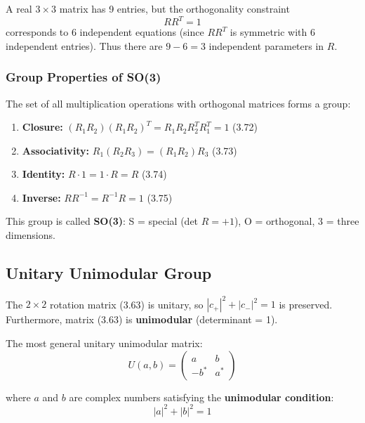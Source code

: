 \documentclass[11pt,a4paper]{article}
\begin{document}
A real $3 \times 3$ matrix has 9 entries, but the orthogonality constraint
\begin{equation}
RR^T = 1
\tag{3.71}
\end{equation}
corresponds to 6 independent equations (since $RR^T$ is symmetric with 6 independent entries). Thus there are $9 - 6 = 3$ independent parameters in $R$.

\subsubsection{Group Properties of SO(3)}

The set of all multiplication operations with orthogonal matrices forms a group:

\begin{enumerate}
\item \textbf{Closure:} $(R_1 R_2)(R_1 R_2)^T = R_1 R_2 R_2^T R_1^T = 1$ \hfill (3.72)
\item \textbf{Associativity:} $R_1(R_2 R_3) = (R_1 R_2)R_3$ \hfill (3.73)
\item \textbf{Identity:} $R \cdot 1 = 1 \cdot R = R$ \hfill (3.74)
\item \textbf{Inverse:} $RR^{-1} = R^{-1}R = 1$ \hfill (3.75)
\end{enumerate}

This group is called \textbf{SO(3)}: S = special (det $R = +1$), O = orthogonal, 3 = three dimensions.

\subsection{Unitary Unimodular Group}

The $2 \times 2$ rotation matrix (3.63) is unitary, so $|c_+|^2 + |c_-|^2 = 1$ is preserved. Furthermore, matrix (3.63) is \textbf{unimodular} (determinant = 1).

The most general unitary unimodular matrix:
\begin{equation}
\boxed{U(a, b) = \begin{pmatrix} a & b \\ -b^* & a^* \end{pmatrix}}
\tag{3.77}
\end{equation}

where $a$ and $b$ are complex numbers satisfying the \textbf{unimodular condition}:
\begin{equation}
|a|^2 + |b|^2 = 1
\tag{3.78}
\end{equation}
\end{document}
